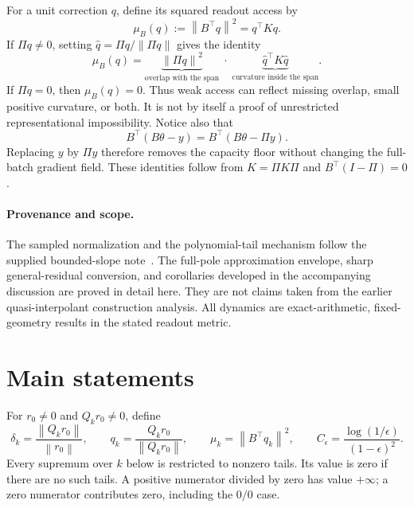 \documentclass[11pt,letterpaper]{article}
\newcommand{\bsaNorm}[1]{\left\lVert #1\right\rVert}
\theoremstyle{remark}
\theoremstyle{plain}
\begin{document}
For a unit correction $q$, define its squared readout access by
\begin{equation}
 \mu_B(q):=\bsaNorm{B^\top q}^2=q^\top Kq.
 \label{bsa:eq:directional-access}
\end{equation}
If $\Pi q\ne0$, setting $\widehat q=\Pi q/\bsaNorm{\Pi q}$ gives the identity
\begin{equation}
 \mu_B(q)=\underbrace{\bsaNorm{\Pi q}^2}_{\text{overlap with the span}}
 \;\cdot\;\underbrace{\widehat q^\top K\widehat q}_{\text{curvature inside the span}}.
 \label{bsa:eq:access-split}
\end{equation}
If $\Pi q=0$, then $\mu_B(q)=0$. Thus weak access can reflect missing overlap, small positive curvature, or both. It is not by itself a proof of unrestricted representational impossibility. Notice also that
\begin{equation}
 B^\top(B\theta-y)=B^\top(B\theta-\Pi y).
 \label{bsa:eq:projected-target}
\end{equation}
Replacing $y$ by $\Pi y$ therefore removes the capacity floor without changing the full-batch gradient field. These identities follow from $K=\Pi K\Pi$ and $B^\top(I-\Pi)=0$.

\paragraph{Provenance and scope.}
The sampled normalization and the polynomial-tail mechanism follow the supplied bounded-slope note~\cite{bsa-original}. The full-pole approximation envelope, sharp general-residual conversion, and corollaries developed in the accompanying discussion are proved in detail here. They are not claims taken from the earlier quasi-interpolant construction analysis. All dynamics are exact-arithmetic, fixed-geometry results in the stated readout metric.

\section{Main statements}
\label{bsa:sec:main}

For $r_0\ne0$ and $Q_kr_0\ne0$, define
\begin{equation}
 \delta_k=\frac{\bsaNorm{Q_kr_0}}{\bsaNorm{r_0}},\qquad
 q_k=\frac{Q_kr_0}{\bsaNorm{Q_kr_0}},\qquad
 \mu_k=\bsaNorm{B^\top q_k}^2,\qquad
 C_\epsilon=\frac{\log(1/\epsilon)}{(1-\epsilon)^2}.
 \label{bsa:eq:tail-data}
\end{equation}
Every supremum over $k$ below is restricted to nonzero tails. Its value is zero if there are no such tails. A positive numerator divided by zero has value $+\infty$; a zero numerator contributes zero, including the $0/0$ case.
\end{document}
